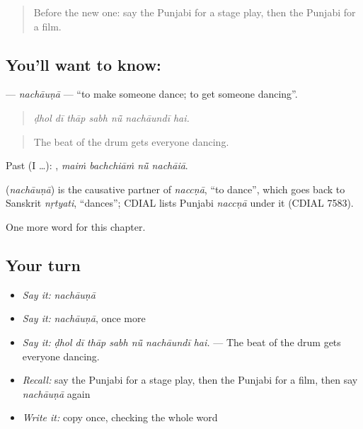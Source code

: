 \label{lesson:PA-C350-nachauna}



\begin{quote}
Before the new one: say the Punjabi for a stage play, then the Punjabi for a film.
\end{quote}

\subsection*{You'll want to know: }
\textbf{} — \emph{nachāuṇā} — \textquotedblleft{}to make someone dance; to get someone dancing\textquotedblright{}.

\begin{quote}
      
\end{quote}

\begin{quote}
\emph{ḍhol dī thāp sabh nū̃ nachāundī hai.}
\end{quote}

\begin{quote}
The beat of the drum gets everyone dancing.
\end{quote}

Past (I …):    , \emph{maiṁ bachchiāṁ nū̃ nachāiā}.

\begin{cousinweb}
\textbf{} (\emph{nachāuṇā}) is the causative partner of \emph{naccṇā}, \textquotedblleft{}to dance\textquotedblright{}, which goes back to Sanskrit \emph{nṛtyati}, \textquotedblleft{}dances\textquotedblright{}; CDIAL lists Punjabi \emph{naccṇā} under it (CDIAL 7583).
\end{cousinweb}

\begin{grammarlens}[title={What you've built}]
One more word for this chapter.
\end{grammarlens}

\subsection*{Your turn}
\begin{itemize}
\raggedright
  \item \emph{Say it:} \emph{nachāuṇā}
  \item \emph{Say it:} \emph{nachāuṇā}, once more
  \item \emph{Say it:} \emph{ḍhol dī thāp sabh nū̃ nachāundī hai.} — The beat of the drum gets everyone dancing.
  \item \emph{Recall:} say the Punjabi for a stage play, then the Punjabi for a film, then say \emph{nachāuṇā} again
  \item \emph{Write it:} copy \textbf{} once, checking the whole word
\end{itemize}

